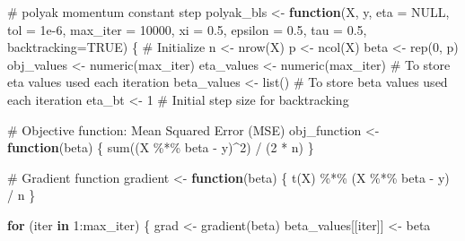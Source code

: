 \documentclass[
  letterpaper,
  DIV=11,
  numbers=noendperiod]{scrartcl}
\newenvironment{Shaded}{\begin{snugshade}}{\end{snugshade}}
\newcommand{\AttributeTok}[1]{\textcolor[rgb]{0.40,0.45,0.13}{#1}}
\newcommand{\CommentTok}[1]{\textcolor[rgb]{0.37,0.37,0.37}{#1}}
\newcommand{\ConstantTok}[1]{\textcolor[rgb]{0.56,0.35,0.01}{#1}}
\newcommand{\ControlFlowTok}[1]{\textcolor[rgb]{0.00,0.23,0.31}{\textbf{#1}}}
\newcommand{\DecValTok}[1]{\textcolor[rgb]{0.68,0.00,0.00}{#1}}
\newcommand{\FloatTok}[1]{\textcolor[rgb]{0.68,0.00,0.00}{#1}}
\newcommand{\FunctionTok}[1]{\textcolor[rgb]{0.28,0.35,0.67}{#1}}
\newcommand{\NormalTok}[1]{\textcolor[rgb]{0.00,0.23,0.31}{#1}}
\newcommand{\OtherTok}[1]{\textcolor[rgb]{0.00,0.23,0.31}{#1}}
\newcommand{\SpecialCharTok}[1]{\textcolor[rgb]{0.37,0.37,0.37}{#1}}
\begin{document}
\begin{Shaded}
\begin{Highlighting}[]
\CommentTok{\# polyak momentum constant step}
\NormalTok{polyak\_bls }\OtherTok{\textless{}{-}} \ControlFlowTok{function}\NormalTok{(X, y, }\AttributeTok{eta =} \ConstantTok{NULL}\NormalTok{, }\AttributeTok{tol =} \FloatTok{1e{-}6}\NormalTok{, }\AttributeTok{max\_iter =} \DecValTok{10000}\NormalTok{, }\AttributeTok{xi =} \FloatTok{0.5}\NormalTok{, }\AttributeTok{epsilon =} \FloatTok{0.5}\NormalTok{, }\AttributeTok{tau =} \FloatTok{0.5}\NormalTok{, }\AttributeTok{backtracking=}\ConstantTok{TRUE}\NormalTok{) \{}
  \CommentTok{\# Initialize}
\NormalTok{  n }\OtherTok{\textless{}{-}} \FunctionTok{nrow}\NormalTok{(X)}
\NormalTok{  p }\OtherTok{\textless{}{-}} \FunctionTok{ncol}\NormalTok{(X)}
\NormalTok{  beta }\OtherTok{\textless{}{-}} \FunctionTok{rep}\NormalTok{(}\DecValTok{0}\NormalTok{, p)}
\NormalTok{  obj\_values }\OtherTok{\textless{}{-}} \FunctionTok{numeric}\NormalTok{(max\_iter)}
\NormalTok{  eta\_values }\OtherTok{\textless{}{-}} \FunctionTok{numeric}\NormalTok{(max\_iter)  }\CommentTok{\# To store eta values used each iteration}
\NormalTok{  beta\_values }\OtherTok{\textless{}{-}} \FunctionTok{list}\NormalTok{() }\CommentTok{\# To store beta values used each iteration}
\NormalTok{  eta\_bt }\OtherTok{\textless{}{-}} \DecValTok{1}  \CommentTok{\# Initial step size for backtracking}
  
  \CommentTok{\# Objective function: Mean Squared Error (MSE)}
\NormalTok{  obj\_function }\OtherTok{\textless{}{-}} \ControlFlowTok{function}\NormalTok{(beta) \{}
    \FunctionTok{sum}\NormalTok{((X }\SpecialCharTok{\%*\%}\NormalTok{ beta }\SpecialCharTok{{-}}\NormalTok{ y)}\SpecialCharTok{\^{}}\DecValTok{2}\NormalTok{) }\SpecialCharTok{/}\NormalTok{ (}\DecValTok{2} \SpecialCharTok{*}\NormalTok{ n)}
\NormalTok{  \}}
  
  \CommentTok{\# Gradient function}
\NormalTok{  gradient }\OtherTok{\textless{}{-}} \ControlFlowTok{function}\NormalTok{(beta) \{}
    \FunctionTok{t}\NormalTok{(X) }\SpecialCharTok{\%*\%}\NormalTok{ (X }\SpecialCharTok{\%*\%}\NormalTok{ beta }\SpecialCharTok{{-}}\NormalTok{ y) }\SpecialCharTok{/}\NormalTok{ n}
\NormalTok{  \}}


  
  \ControlFlowTok{for}\NormalTok{ (iter }\ControlFlowTok{in} \DecValTok{1}\SpecialCharTok{:}\NormalTok{max\_iter) \{}
\NormalTok{    grad }\OtherTok{\textless{}{-}} \FunctionTok{gradient}\NormalTok{(beta)}
\NormalTok{    beta\_values[[iter]] }\OtherTok{\textless{}{-}}\NormalTok{ beta}
    

\end{Highlighting}
\end{Shaded}
\end{document}
